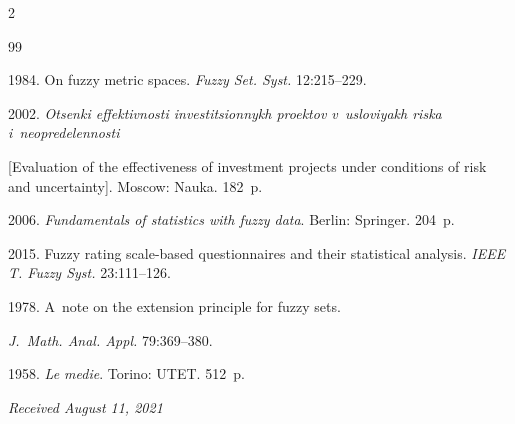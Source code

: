 \begin{multicols}{2}
{{\begin{thebibliography}{99}


 1984. On fuzzy metric spaces. \textit{Fuzzy Set.  Syst.} 12:215--229.




 2002. \textit{Otsenki effektivnosti investitsionnykh proektov v~usloviyakh riska i~neopredelennosti} 


[Evaluation of the effectiveness of investment projects under conditions of risk and uncertainty]. Moscow: Nauka. 182~p. 




 2006. \textit{Fundamentals of statistics with fuzzy data}. Berlin: Springer. 204~p.






 2015. Fuzzy rating scale-based questionnaires and their statistical analysis. \textit{IEEE T. Fuzzy Syst.} 23:111--126.




 1978. A~note on the extension principle for fuzzy sets. 


\textit{J.~Math. Anal. Appl.} 79:369--380.




 1958. \textit{Le medie}. Torino: UTET. 512~p.


\end{thebibliography}





 }


 }





\end{multicols}





\vspace*{-6pt}





\hfill{\small\textit{Received August 11, 2021}} 





\vspace*{-12pt}





